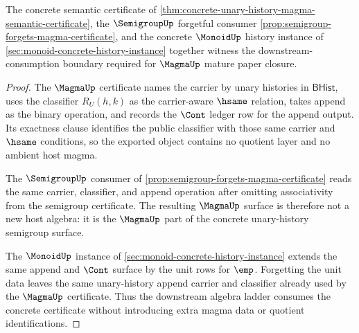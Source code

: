 \begin{theorem}
\label{thm:magma-mature-downstream-consumption-boundary}
The concrete semantic certificate of
\autoref{thm:concrete-unary-history-magma-semantic-certificate}, the
$\SemigroupUp$ forgetful consumer
\autoref{prop:semigroup-forgets-magma-certificate}, and the concrete
$\MonoidUp$ history instance of \autoref{sec:monoid-concrete-history-instance}
together witness the downstream-consumption boundary required for
$\MagmaUp$ mature paper closure.
\end{theorem}
\begin{proof}
The $\MagmaUp$ certificate names the carrier by unary histories in
$\mathsf{BHist}$, uses the classifier $R_U(h,k)$ as the carrier-aware $\hsame$
relation, takes append as the binary operation, and records the $\Cont$ ledger
row for the append output.
Its exactness clause identifies the public classifier with those same carrier
and $\hsame$ conditions, so the exported object contains no quotient layer and
no ambient host magma.

The $\SemigroupUp$ consumer of
\autoref{prop:semigroup-forgets-magma-certificate} reads the same carrier,
classifier, and append operation after omitting associativity from the
semigroup certificate. The resulting $\MagmaUp$ surface is therefore not a new
host algebra: it is the $\MagmaUp$ part of the concrete unary-history
semigroup surface.

The $\MonoidUp$ instance of \autoref{sec:monoid-concrete-history-instance}
extends the same append and $\Cont$ surface by the unit rows for $\emp$.
Forgetting the unit data leaves the same unary-history append carrier and
classifier already used by the $\MagmaUp$ certificate. Thus the downstream
algebra ladder consumes the concrete certificate without introducing extra
magma data or quotient identifications.
\end{proof}

